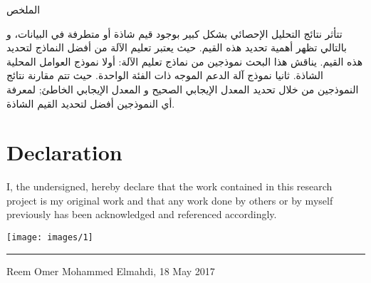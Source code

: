 \begin{RLtext}
\huge{الملخص}
\end{RLtext}

\begin{RLtext}


تتأثر نتائج التحليل الإحصائي بشكل كبير بوجود قيم شاذة أو متطرفة في البيانات، و بالتالي تظهر أهمية تحديد هذه القيم. حيث يعتبر تعليم الآلة من أفضل النماذج لتحديد هذه القيم. يناقش هذا البحث نموذجين من نماذج تعليم الآلة: أولا نموذج العوامل المحلية الشاذة. ثانيا نموذج  آلة الدعم الموجه ذات الفئة الواحدة. حيث تتم مقارنة نتائج النموذجين من خلال تحديد المعدل الإيجابي الصحيح و المعدل الإيجابي الخاطئ; لمعرفة أي النموذجين أفضل لتحديد القيم الشاذة.
\end{RLtext}

\vfill
\section*{Declaration}
I, the undersigned, hereby declare that the work contained in this research project is my original work and that any work done by others or by myself previously has been acknowledged and referenced accordingly.

\texttt{[image: images/1]} \newline \hrule
Reem Omer Mohammed Elmahdi, 18 May 2017